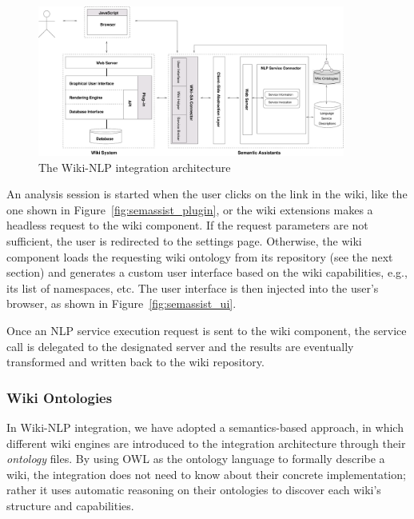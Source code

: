 \begin{figure}
\centering
\includegraphics[width=0.9\textwidth]{pictures/wikinlp_arch}
\caption{The Wiki-NLP integration architecture}
\label{fig:wikinlp_arch}
\end{figure}

An analysis session is started when the user clicks on the \sa link in the wiki, like the one shown in Figure~\ref{fig:semassist_plugin}, or the wiki extensions makes a headless request to the wiki component. If the request parameters are not sufficient, the user is redirected to the settings page. Otherwise, the wiki component loads the requesting wiki ontology from its repository (see the next section) and generates a custom user interface based on the wiki capabilities, e.g., its list of namespaces, etc. The user interface is then injected into the user's browser, as shown in Figure~\ref{fig:semassist_ui}.

Once an NLP service execution request is sent to the wiki component, the service call is delegated to the designated \sa server and the results are eventually transformed and written back to the wiki repository.

\subsubsection{Wiki Ontologies}
In Wiki-NLP integration, we have adopted a semantics-based approach, in which different wiki engines are introduced to the integration architecture through their \emph{ontology} files. By using OWL as the ontology language to formally describe a wiki, the integration does not need to know about their concrete implementation; rather it uses automatic reasoning on their ontologies to discover each wiki's structure and capabilities.


